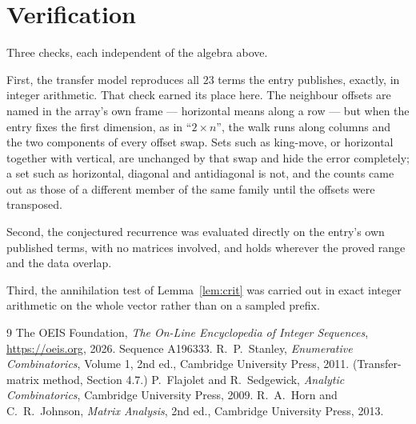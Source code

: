 \documentclass[11pt,a4paper]{article}
\theoremstyle{plain}
\theoremstyle{definition}
\begin{document}
\section{Verification}

Three checks, each independent of the algebra above.

First, the transfer model reproduces all $23$ terms the entry publishes, exactly, in
integer arithmetic. That check earned its place here. The neighbour offsets are named in the
array's own frame --- horizontal means along a row --- but when the entry fixes the first
dimension, as in ``$2\times n$'', the walk runs along columns and the two components of every
offset swap. Sets such as king-move, or horizontal together with vertical, are unchanged by
that swap and hide the error completely; a set such as horizontal, diagonal and antidiagonal
is not, and the counts came out as those of a different member of the same family until the
offsets were transposed.

Second, the conjectured recurrence was evaluated directly on the entry's own published terms,
with no matrices involved, and holds wherever the proved range and the data overlap.

Third, the annihilation test of Lemma~\ref{lem:crit} was carried out in exact integer
arithmetic on the whole vector rather than on a sampled prefix.

\begin{thebibliography}{9}
 The OEIS Foundation, \emph{The On-Line Encyclopedia of Integer
Sequences}, \url{https://oeis.org}, 2026. Sequence A196333.
 R.~P.~Stanley, \emph{Enumerative Combinatorics}, Volume 1, 2nd ed.,
Cambridge University Press, 2011. (Transfer-matrix method, Section 4.7.)
 P.~Flajolet and R.~Sedgewick, \emph{Analytic Combinatorics}, Cambridge
University Press, 2009.
 R.~A.~Horn and C.~R.~Johnson, \emph{Matrix Analysis}, 2nd ed., Cambridge
University Press, 2013.
\end{thebibliography}
\end{document}
